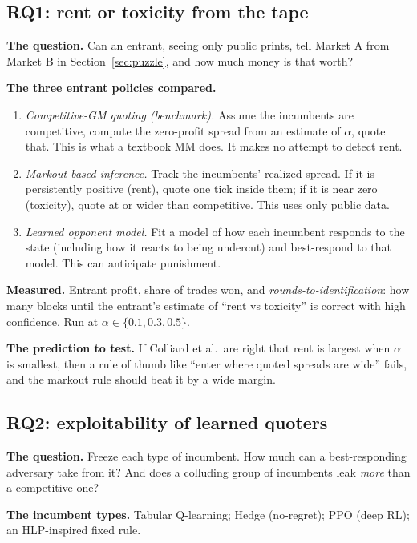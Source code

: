 \documentclass[11pt]{article}
\begin{document}
\subsection{RQ1: rent or toxicity from the tape}
\textbf{The question.} Can an entrant, seeing only public prints, tell Market A from Market B in Section~\ref{sec:puzzle}, and how much money is that worth?

\textbf{The three entrant policies compared.}
\begin{enumerate}
\item \emph{Competitive-GM quoting (benchmark).} Assume the incumbents are competitive, compute the zero-profit spread from an estimate of $\alpha$, quote that. This is what a textbook MM does. It makes no attempt to detect rent.
\item \emph{Markout-based inference.} Track the incumbents' realized spread. If it is persistently positive (rent), quote one tick inside them; if it is near zero (toxicity), quote at or wider than competitive. This uses only public data.
\item \emph{Learned opponent model.} Fit a model of how each incumbent responds to the state (including how it reacts to being undercut) and best-respond to that model. This can anticipate punishment.
\end{enumerate}
\textbf{Measured.} Entrant profit, share of trades won, and \emph{rounds-to-identification}: how many blocks until the entrant's estimate of ``rent vs toxicity'' is correct with high confidence. Run at $\alpha\in\{0.1,0.3,0.5\}$.

\textbf{The prediction to test.} If Colliard et al.\ are right that rent is largest when $\alpha$ is smallest, then a rule of thumb like ``enter where quoted spreads are wide'' fails, and the markout rule should beat it by a wide margin.

\subsection{RQ2: exploitability of learned quoters}
\textbf{The question.} Freeze each type of incumbent. How much can a best-responding adversary take from it? And does a colluding group of incumbents leak \emph{more} than a competitive one?

\textbf{The incumbent types.} Tabular Q-learning; Hedge (no-regret); PPO (deep RL); an HLP-inspired fixed rule.
\end{document}

